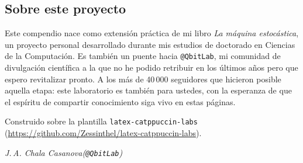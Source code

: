 \subsection*{Sobre este proyecto}

Este compendio nace como extensión práctica de mi libro \textit{La máquina
estocástica}, un proyecto personal desarrollado durante mis estudios de
doctorado en Ciencias de la Computación. Es también un puente hacia
\texttt{@QbitLab}, mi comunidad de divulgación científica a la que no he
podido retribuir en los últimos años pero que espero revitalizar pronto.
A los más de 40\,000 seguidores que hicieron posible aquella etapa: este
laboratorio es también para ustedes, con la esperanza de que el espíritu
de compartir conocimiento siga vivo en estas páginas.

\vspace{0.3cm}
\noindent
Construido sobre la plantilla \texttt{latex-catppuccin-labs}
(\url{https://github.com/Zessinthel/latex-catppuccin-labs}).

\vspace{1.2cm}
\begin{flushright}
\textit{J.\,A. Chala Casanova\enspace(\texttt{@QbitLab})}\\[2pt]
\the\year
\end{flushright}